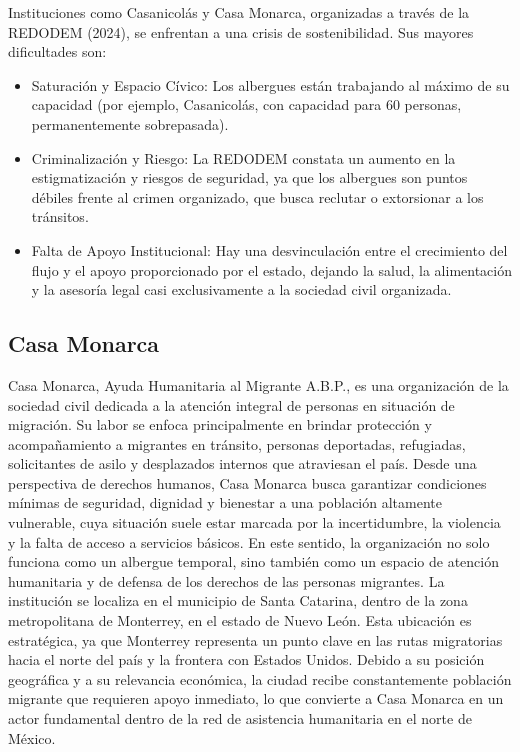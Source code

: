 \documentclass[12pt]{report}
\begin{document}
Instituciones como Casanicolás y Casa Monarca, organizadas a través de la REDODEM (2024), se enfrentan a una crisis de sostenibilidad. Sus mayores dificultades son:
\begin{itemize}
    \item Saturación y Espacio Cívico: Los albergues están trabajando al máximo de su capacidad (por ejemplo, Casanicolás, con capacidad para 60 personas, permanentemente sobrepasada).

    \item Criminalización y Riesgo: La REDODEM constata un aumento en la estigmatización y riesgos de seguridad, ya que los albergues son puntos débiles frente al crimen organizado, que busca reclutar o extorsionar a los tránsitos.

    \item Falta de Apoyo Institucional: Hay una desvinculación entre el crecimiento del flujo y el apoyo proporcionado por el estado, dejando la salud, la alimentación y la asesoría legal casi exclusivamente a la sociedad civil organizada.
\end{itemize}

\subsection{Casa Monarca}
Casa Monarca, Ayuda Humanitaria al Migrante A.B.P., es una organización de la sociedad civil dedicada a la atención integral de personas en situación de migración. Su labor se enfoca principalmente en brindar protección y acompañamiento a migrantes en tránsito, personas deportadas, refugiadas, solicitantes de asilo y desplazados internos que atraviesan el país. Desde una perspectiva de derechos humanos, Casa Monarca busca garantizar condiciones mínimas de seguridad, dignidad y bienestar a una población altamente vulnerable, cuya situación suele estar marcada por la incertidumbre, la violencia y la falta de acceso a servicios básicos. En este sentido, la organización no solo funciona como un albergue temporal, sino también como un espacio de atención humanitaria y de defensa de los derechos de las personas migrantes. La institución se localiza en el municipio de Santa Catarina, dentro de la zona metropolitana de Monterrey, en el estado de Nuevo León. Esta ubicación es estratégica, ya que Monterrey representa un punto clave en las rutas migratorias hacia el norte del país y la frontera con Estados Unidos. Debido a su posición geográfica y a su relevancia económica, la ciudad recibe constantemente población migrante que requieren apoyo inmediato, lo que convierte a Casa Monarca en un actor fundamental dentro de la red de asistencia humanitaria en el norte de México.\\
\end{document}
